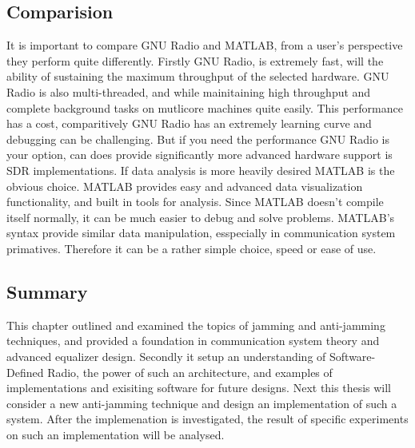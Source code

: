 \subsection{Comparision}

It is important to compare GNU Radio and MATLAB, from a user's perspective they perform quite differently.  Firstly GNU Radio, is extremely fast, will the ability of sustaining the maximum throughput of the selected hardware.  GNU Radio is also multi-threaded, and while mainitaining high throughput and complete background tasks on mutlicore machines quite easily.  This performance has a cost, comparitively GNU Radio has an extremely learning curve and debugging can be challenging.  But if you need the performance GNU Radio is your option, can does provide significantly more advanced hardware support is SDR implementations.  If data analysis is more heavily desired MATLAB is the obvious choice.  MATLAB provides easy and advanced data visualization functionality, and built in tools for analysis.  Since MATLAB doesn't compile itself normally, it can be much easier to debug and solve problems.  MATLAB's syntax provide similar data manipulation, esspecially in communication system primatives.  Therefore it can be a rather simple choice, speed or ease of use.\\ 

\subsection{Summary}

This chapter outlined and examined the topics of jamming and anti-jamming techniques, and provided a foundation in communication system theory and advanced equalizer design.  Secondly it setup an understanding of Software-Defined Radio, the power of such an architecture, and examples of implementations and exisiting software for future designs.  Next this thesis will consider a new anti-jamming technique and design an implementation of such a system.  After the implemenation is investigated, the result of specific experiments on such an implementation will be analysed.\\
